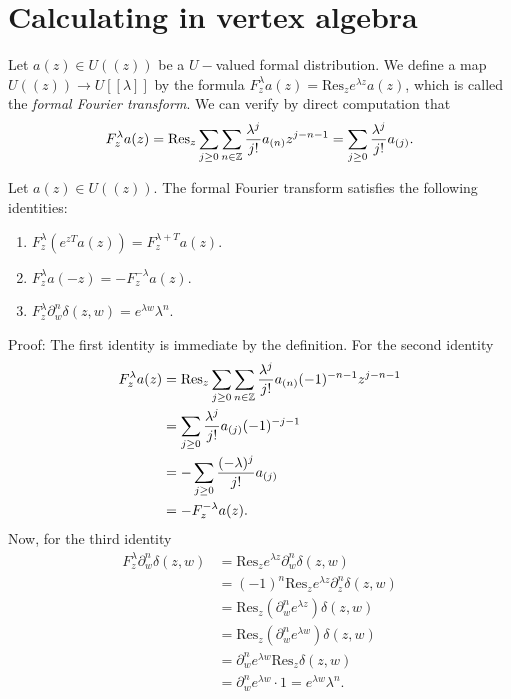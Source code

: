 \section{Calculating in vertex algebra}
Let $a(z)\in U((z))$ be a $U-$valued formal distribution. We define a map $U((z))\rightarrow U[[\lambda]]$ by the formula $F_z^\lambda a(z)=\text{Res}_ze^{\lambda z}a(z)$, which is called the \textit{formal Fourier transform}. We can verify by direct computation that
\begin{equation}
      F_z^\lambda a(z) = \text{Res}_z\sum_{j\geq0}\sum_{n\in\mathbb{Z}}\frac{\lambda^j}{j!}a_{(n)}z^{j-n-1} =\sum_{j\geq0}\frac{\lambda^j}{j!}a_{(j)}.
\end{equation}
\begin{dang}
    \begin{lemma}\label{Lemma: formal fourier transform identities}\cite{de2006finite}
        Let $a(z)\in U((z))$. The formal Fourier transform satisfies the following identities:
        \begin{enumerate}
            \item[(1)] $F_z^\lambda(e^{zT}a(z))=F_z^{\lambda+T}a(z)$.
            \item[(2)] $F_z^\lambda a(-z)=-F_z^{-\lambda}a(z)$.
            \item[(3)] $F_z^\lambda\partial_w^n\delta(z,w)=e^{\lambda w}\lambda^n$.
        \end{enumerate}
    \end{lemma}
\end{dang}
Proof: The first identity is immediate by the definition. For the second identity
\begin{equation}
    \begin{split}
         F_z^\lambda a(z) &= \text{Res}_z\sum_{j\geq0}\sum_{n\in\mathbb{Z}}\frac{\lambda^j}{j!}a_{(n)}(-1)^{-n-1}z^{j-n-1}\\
         &=\sum_{j\geq0}\frac{\lambda^j}{j!}a_{(j)}(-1)^{-j-1}\\
         &=-\sum_{j\geq0}\frac{(-\lambda)^j}{j!}a_{(j)}\\
         &=-F_z^{-\lambda}a(z).
    \end{split}
\end{equation}
Now, for the third identity
\begin{equation}
    \begin{split}
        F_z^\lambda\partial_w^n\delta(z,w)&=\text{Res}_ze^{\lambda z}\partial_w^n\delta(z,w)\\
        &=(-1)^n\text{Res}_ze^{\lambda z}\partial_z^n\delta(z,w)\\
        &=\text{Res}_z(\partial_w^ne^{\lambda z})\delta(z,w)\\
        &=\text{Res}_z(\partial_w^ne^{\lambda w})\delta(z,w)\\
        &=\partial_w^ne^{\lambda w}\text{Res}_z\delta(z,w)\\
        &=\partial_w^ne^{\lambda w}\cdot 1= e^{\lambda w}\lambda^n.
    \end{split}
\end{equation}
